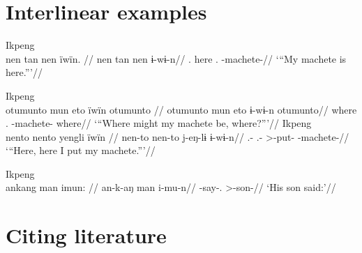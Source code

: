 \documentclass{article}
\begin{document}
\section{Interlinear examples}

\ex Ikpeng\\
\label{ekiri-13}    \begingl
    \glpreamble nen tan nen ïwïn. //
    \gla nen tan nen ɨ-wɨ-n//
    \glb {}. here . -machete-//
        \glft ‘“My machete is here.”’//  
    \endgl 
\xe

\pex\label{}    \a Ikpeng\\
    \label{ekiri-9}        \begingl
        \glpreamble otumunto mun eto ïwïn otumunto //
        \gla otumunto mun eto ɨ-wɨ-n otumunto//
        \glb where .  -machete- where//
            \glft ‘“Where might my machete be, where?”’//  
        \endgl 
    \a Ikpeng\\
    \label{ekiri-10}        \begingl
        \glpreamble nento nento yengli ïwïn //
        \gla nen-to nen-to j-eŋ-lɨ ɨ-wɨ-n//
        \glb {}.- .- >-put- -machete-//
            \glft ‘“Here, here I put my machete.”’//  
        \endgl 
\xe

\ex Ikpeng\\
\label{ekiri-11}    \begingl
    \glpreamble ankang man imun: //
    \gla an-k-aŋ man i-mu-n//
    \glb {}-say-.  >-son-//
        \glft ‘His son said:’//  
    \endgl 
\xe

\section{\texorpdfstring{Citing literature
\label{sec:sources}}{Citing literature }}
\end{document}
